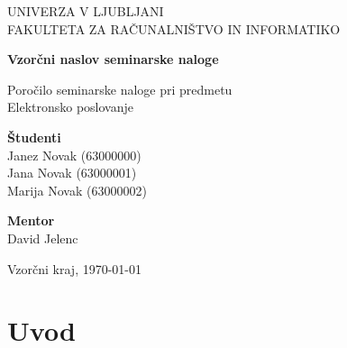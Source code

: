 \documentclass[a4paper,12pt]{report}
\newcommand{\naslov}     {Vzorčni naslov seminarske naloge}
\newcommand{\prviavtor}  {Janez Novak}
\newcommand{\prviindeks} {63000000}
\newcommand{\drugiavtor} {Jana Novak}
\newcommand{\drugiindeks}{63000001}
\newcommand{\tretjiavtor} {Marija Novak}
\newcommand{\tretjiindeks}{63000002}
\newcommand{\kraj}       {Vzorčni kraj}
\begin{document}
\begin{titlepage}
	\begin{center}
	{UNIVERZA V LJUBLJANI\\[10pt] 
	FAKULTETA ZA RAČUNALNIŠTVO IN INFORMATIKO}

	\vspace{65mm}

	{\Large\textbf{\naslov}}

	\vspace{10mm}

	{\large Poročilo seminarske naloge pri predmetu\\[10pt] Elektronsko poslovanje}

	\vfill
	\vspace{60mm}

\hspace{20mm}
\begin{minipage}[t]{70mm}
	{\bf Študenti}\\
	{\prviavtor} ({\prviindeks})\\ 
	{\drugiavtor} ({\drugiindeks})\\
	{\tretjiavtor} ({\tretjiindeks})
\end{minipage}
\begin{minipage}[t]{50mm}
	{\bf Mentor}\\
	David Jelenc
\end{minipage}

	\vspace{35mm}

	{	\kraj, \today}
	\end{center}
\end{titlepage}


\tableofcontents


\chapter{Uvod}
\end{document}
